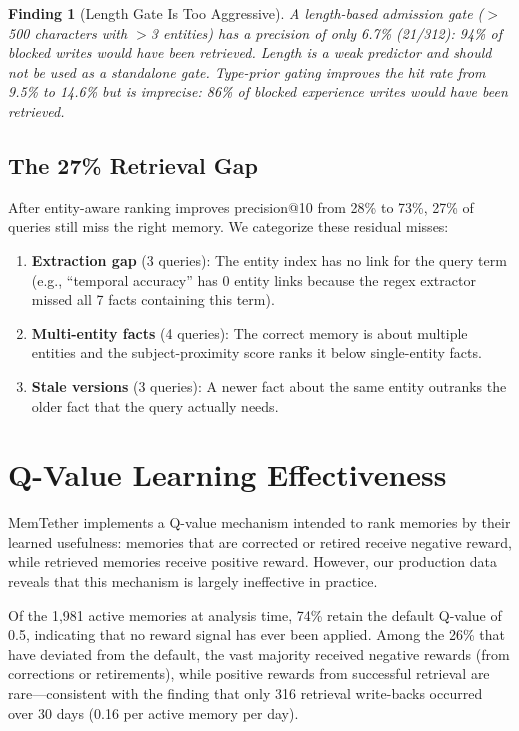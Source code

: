 \documentclass[10pt,twocolumn]{article}
\newtheorem{finding}{Finding}
\begin{document}
\begin{finding}[Length Gate Is Too Aggressive]
A length-based admission gate ($>$500 characters with $>$3 entities) has a precision of only 6.7\% (21/312): 94\% of blocked writes would have been retrieved. Length is a weak predictor and should not be used as a standalone gate. Type-prior gating improves the hit rate from 9.5\% to 14.6\% but is imprecise: 86\% of blocked experience writes would have been retrieved.
\end{finding}

\subsection{The 27\% Retrieval Gap}

After entity-aware ranking improves precision@10 from 28\% to 73\%, 27\% of queries still miss the right memory. We categorize these residual misses:

\begin{enumerate}
\item \textbf{Extraction gap} (3 queries): The entity index has no link for the query term (e.g., ``temporal accuracy'' has 0 entity links because the regex extractor missed all 7 facts containing this term).
\item \textbf{Multi-entity facts} (4 queries): The correct memory is about multiple entities and the subject-proximity score ranks it below single-entity facts.
\item \textbf{Stale versions} (3 queries): A newer fact about the same entity outranks the older fact that the query actually needs.
\end{enumerate}


\section{Q-Value Learning Effectiveness}
\label{sec:qvalue}

MemTether implements a Q-value mechanism intended to rank memories by their learned usefulness: memories that are corrected or retired receive negative reward, while retrieved memories receive positive reward. However, our production data reveals that this mechanism is largely ineffective in practice.

Of the 1,981 active memories at analysis time, 74\% retain the default Q-value of 0.5, indicating that no reward signal has ever been applied. Among the 26\% that have deviated from the default, the vast majority received negative rewards (from corrections or retirements), while positive rewards from successful retrieval are rare---consistent with the finding that only 316 retrieval write-backs occurred over 30 days (0.16 per active memory per day).
\end{document}
